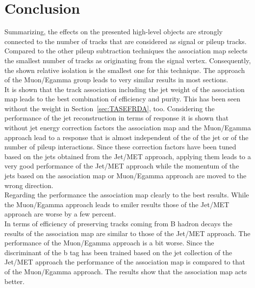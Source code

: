 \section{Conclusion}

Summarizing, the effects on the presented high-level objects are strongly connected to the number of tracks that are considered as signal or pileup tracks. Compared to the other pileup subtraction techniques the association map selects the smallest number of tracks as originating from the signal vertex. Consequently, the shown relative isolation is the smallest one for this technique. The approach of the Muon/Egamma group leads to very similar results in most sections. \\
It is shown that the track association including the jet weight of the association map leads to the best combination of efficiency and purity. This has been seen without the weight in Section~\ref{sec:TASEFRDA}, too. Considering the performance of the jet reconstruction in terms of \pt{} response it is shown that without jet energy correction factors the association map and the Muon/Egamma approach lead to a \pt{} response that is almost independent of the \pt{} of the jet or of the number of pileup interactions. Since these correction factors have been tuned based on the jets obtained from the Jet/MET approach, applying them leads to a very good performance of the Jet/MET approach while the momentum of the jets based on the association map or Muon/Egamma approach are moved to the wrong direction. \\
Regarding the performance the association map clearly to the best results. While the Muon/Egamma approach leads to smiler results those of the Jet/MET approach are worse by a few percent. \\
In terms of efficiency of preserving tracks coming from B hadron decays the results of the association map are similar to those of the Jet/MET approach. The performance of the Muon/Egamma approach is a bit worse. Since the discriminant of the b tag has been trained based on the jet collection of the Jet/MET approach the performance of the association map is compared to that of the Muon/Egamma approach. The results show that the association map acts better.